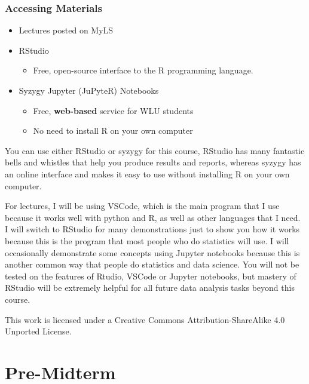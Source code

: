 \documentclass[
  letterpaper,
  DIV=11,
  numbers=noendperiod]{scrreprt}
\providecommand{\tightlist}{%
  \setlength{\itemsep}{0pt}\setlength{\parskip}{0pt}}\usepackage{longtable,booktabs,array}
\def\lspace{}
\begin{document}
\hypertarget{accessing-materials}{%
\section*{Accessing Materials}\label{accessing-materials}}


\begin{itemize}
\tightlist
\item
  Lectures posted on MyLS\lspace
\item
  RStudio

  \begin{itemize}
  \tightlist
  \item
    Free, open-source interface to the R programming language.\lspace
  \end{itemize}
\item
  Syzygy Jupyter (JuPyteR) Notebooks

  \begin{itemize}
  \tightlist
  \item
    Free, \textbf{web-based} service for WLU students
  \item
    No need to install R on your own computer\lspace
  \end{itemize}
\end{itemize}

You can use either RStudio or syzygy for this course, RStudio has many
fantastic bells and whistles that help you produce results and reports,
whereas syzygy has an online interface and makes it easy to use without
installing R on your own computer.

For lectures, I will be using VSCode, which is the main program that I
use because it works well with python and R, as well as other languages
that I need. I will switch to RStudio for many demonstrations just to
show you how it works because this is the program that most people who
do statistics will use. I will occasionally demonstrate some concepts
using Jupyter notebooks because this is another common way that people
do statistics and data science. You will not be tested on the features
of Rtudio, VSCode or Jupyter notebooks, but mastery of RStudio will be
extremely helpful for all future data analysis tasks beyond this course.

This work is licensed under a Creative Commons Attribution-ShareAlike
4.0 Unported License.

\part{Pre-Midterm}
\end{document}
